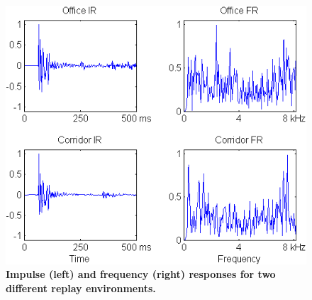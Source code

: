 \begin{figure}
	\centering
	\includegraphics[width=1\linewidth]{Figs/Room_IRs.png}
	\caption{\bfseries Impulse (left) and frequency (right) responses for two different replay environments.}
	\label{fig::Room_IRs}
\end{figure}




